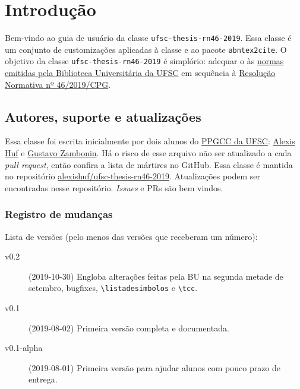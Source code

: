 \documentclass[embeddedlogo]{ufsc-thesis-rn46-2019}
\newcommand{\lacmd}[1]{\texttt{\textbackslash{}#1}}
\begin{document}
\tableofcontents*%

\textual%

\chapter{Introdução}

Bem-vindo ao guia de usuário da classe \texttt{ufsc-thesis-rn46-2019}. Essa
classe é um conjunto de customizações aplicadas à classe
\href{https://ctan.org/pkg/abntex2}{\abnTeX} e ao pacote \texttt{abntex2cite}.
O objetivo da classe \texttt{ufsc-thesis-rn46-2019} é simplório: adequar o
\abnTeX{} às \href{http://portal.bu.ufsc.br/normalizacao/}{normas emitidas pela
Biblioteca Universitária da UFSC} em sequência à
\href{https://repositorio.ufsc.br/handle/123456789/197121}{Resolução Normativa
nº 46/2019/CPG}.


\section{Autores, suporte e atualizações}

Essa classe foi escrita inicialmente por dois alunos do
\href{http://ppgcc.posgrad.ufsc.br/}{PPGCC da UFSC}:
\href{mailto:alexishuf@gmail.com}{Alexis Huf} e
\href{mailto:gustavo.zambonin@posgrad.ufsc.br}{Gustavo Zambonin}.  Há o risco de
esse arquivo não ser atualizado a cada \textit{pull request}, então confira a
lista de mártires no GitHub. Essa classe é mantida no repositório
\href{https://github.com/alexishuf/ufsc-thesis-rn46-2019/}{alexishuf/ufsc-thesis-rn46-2019}.
Atualizações podem ser encontradas nesse repositório. \textit{Issues} e PRs são
bem vindos.

\subsection{Registro de mudanças}

Lista de versões (pelo menos das versões que receberam um número):
\begin{description}
\item[v0.2] (2019-10-30) Engloba alterações feitas pela BU na segunda metade de
  setembro, bugfixes, \lacmd{listadesimbolos} e \lacmd{tcc}.
\item[v0.1] (2019-08-02) Primeira versão completa e documentada.
\item[v0.1-alpha] (2019-08-01) Primeira versão para ajudar alunos com pouco
    prazo de entrega.
\end{description}
\end{document}
